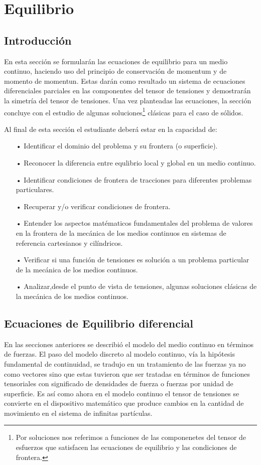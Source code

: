 \documentclass[../notas medios.tex]{subfiles}
\begin{document}
\chapter{Equilibrio}

\graphicspath{{IMAGES/Cap4/}} 								 %
\section{Introducción}

En esta sección se formularán las ecuaciones de equilibrio para un medio continuo, haciendo uso del principio de conservación de momentum y de momento de momentun. Estas darán como resultado un sistema de ecuaciones diferenciales parciales en las componentes del tensor de tensiones y demostrarán la simetría del tensor de tensiones. Una vez planteadas las ecuaciones, la sección concluye con el estudio de algunas soluciones\footnote{Por soluciones nos referimos a funciones de las componenetes del tensor de esfuerzos que satisfacen las ecuaciones de equilibrio y las condiciones de frontera.} clásicas para el caso de sólidos.

Al final de esta sección el estudiante deberá estar en la capacidad de:

\begin{itemize}
\item[•] Identificar el dominio del problema y su frontera (o superficie).
\item[•] Reconocer la diferencia entre equlibrio local y global en un medio continuo.
\item[•] Identificar condiciones de frontera de tracciones para diferentes problemas particulares.
\item[•] Recuperar y/o verificar condiciones de frontera.
\item[•] Entender los aspectos matématicos fundamentales del problema de valores en la frontera de la mecánica de los medios continuos en sistemas de referencia cartesianos y cilíndricos.
\item[•] Verificar si una función de tensiones es solución a un problema particular de la mecánica de los medios continuos.
\item[•] Analizar,desde el punto de vista de tensiones, algunas soluciones clásicas de la mecánica de los medios continuos.
\end{itemize}


\section{Ecuaciones de Equilibrio diferencial}
En las secciones anteriores se describió el modelo del medio continuo en términos de fuerzas.  El paso del modelo discreto al modelo continuo, vía la hipótesis fundamental de continuidad, se tradujo en un tratamiento de las fuerzas ya no como vectores sino que estas tuvieron que ser tratadas en términos de funciones tensoriales con significado de densidades de fuerza o fuerzas por unidad de superficie.  Es así como ahora en el modelo continuo el tensor de tensiones se convierte en el dispositivo matemático que produce cambios en la cantidad de movimiento en el sistema de infinitas partículas.
\end{document}
